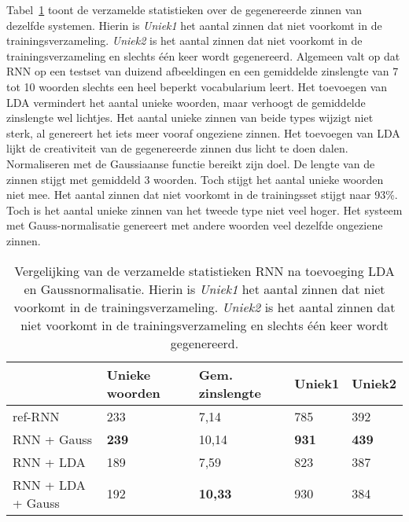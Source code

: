 Tabel~\ref{table:rnn_lda_stats} toont de verzamelde statistieken over de gegenereerde zinnen van dezelfde systemen. Hierin is \emph{Uniek1} het aantal zinnen dat niet voorkomt in de trainingsverzameling. \emph{Uniek2} is het aantal zinnen dat niet voorkomt in de trainingsverzameling en slechts \'e\'en keer wordt gegenereerd.
Algemeen valt op dat RNN op een testset van duizend afbeeldingen en een gemiddelde zinslengte van 7 tot 10 woorden slechts een heel beperkt vocabularium leert.
Het toevoegen van LDA vermindert het aantal unieke woorden, maar verhoogt de gemiddelde zinslengte wel lichtjes. Het aantal unieke zinnen van beide types wijzigt niet sterk, al genereert het iets meer vooraf ongeziene zinnen. Het toevoegen van LDA lijkt de creativiteit van de gegenereerde zinnen dus licht te doen dalen.
Normaliseren met de Gaussiaanse functie bereikt zijn doel. De lengte van de zinnen stijgt met gemiddeld 3 woorden. Toch stijgt het aantal unieke woorden niet mee. Het aantal zinnen dat niet voorkomt in de trainingsset stijgt naar 93\%. Toch is het aantal unieke zinnen van het tweede type niet veel hoger. Het systeem met Gauss-normalisatie genereert met andere woorden veel dezelfde ongeziene zinnen.

\begin{table}
	\begin{tabular}{lllll}
		~                 & Unieke woorden & Gem. zinslengte & Uniek1 & Uniek2 \\ \hline
		ref-RNN           & 233            & 7,14           & 785    & 392    \\
		RNN + Gauss       & \textbf{239}   & 10,14          & \textbf{931}    & \textbf{439}    \\
		RNN + LDA         & 189            & 7,59           & 823    & 387    \\
		RNN + LDA + Gauss & 192            & \textbf{10,33}          & 930    & 384    \\
	\end{tabular}
	\caption[Vergelijking van de verzamelde statistieken RNN na toevoeging LDA en Gaussnormalisatie]{Vergelijking van de verzamelde statistieken RNN na toevoeging LDA en Gaussnormalisatie. Hierin is \emph{Uniek1} het aantal zinnen dat niet voorkomt in de trainingsverzameling. \emph{Uniek2} is het aantal zinnen dat niet voorkomt in de trainingsverzameling en slechts \'e\'en keer wordt gegenereerd.}
	\label{table:rnn_lda_stats}
\end{table}

